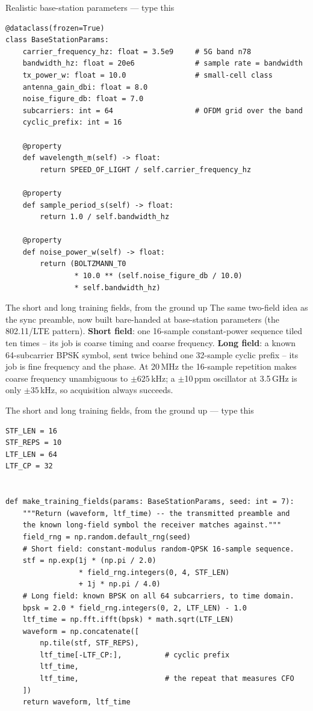 \documentclass[10pt]{beamer}
\begin{document}
\begin{frame}[fragile]{Realistic base-station parameters --- type this}
\begin{lstlisting}[basicstyle=\ttfamily\tiny]
@dataclass(frozen=True)
class BaseStationParams:
    carrier_frequency_hz: float = 3.5e9     # 5G band n78
    bandwidth_hz: float = 20e6              # sample rate = bandwidth
    tx_power_w: float = 10.0                # small-cell class
    antenna_gain_dbi: float = 8.0
    noise_figure_db: float = 7.0
    subcarriers: int = 64                   # OFDM grid over the band
    cyclic_prefix: int = 16

    @property
    def wavelength_m(self) -> float:
        return SPEED_OF_LIGHT / self.carrier_frequency_hz

    @property
    def sample_period_s(self) -> float:
        return 1.0 / self.bandwidth_hz

    @property
    def noise_power_w(self) -> float:
        return (BOLTZMANN_T0
                * 10.0 ** (self.noise_figure_db / 10.0)
                * self.bandwidth_hz)
\end{lstlisting}
\end{frame}

\begin{frame}{The short and long training fields, from the ground up}
  The same two-field idea as the sync preamble, now built
  bare-handed at base-station parameters (the 802.11/LTE
  pattern). \textbf{Short field}: one 16-sample
  constant-power sequence tiled ten times -- its job is
  coarse timing and coarse frequency. \textbf{Long field}:
  a known 64-subcarrier BPSK symbol, sent twice behind one
  32-sample cyclic prefix -- its job is fine frequency and
  the phase. At 20\,MHz the 16-sample repetition makes
  coarse frequency unambiguous to $\pm 625$\,kHz; a
  $\pm$10\,ppm oscillator at 3.5\,GHz is only
  $\pm 35$\,kHz, so acquisition always succeeds.
\end{frame}

\begin{frame}[fragile]{The short and long training fields, from the ground up --- type this}
\begin{lstlisting}[basicstyle=\ttfamily\tiny]
STF_LEN = 16
STF_REPS = 10
LTF_LEN = 64
LTF_CP = 32


def make_training_fields(params: BaseStationParams, seed: int = 7):
    """Return (waveform, ltf_time) -- the transmitted preamble and
    the known long-field symbol the receiver matches against."""
    field_rng = np.random.default_rng(seed)
    # Short field: constant-modulus random-QPSK 16-sample sequence.
    stf = np.exp(1j * (np.pi / 2.0)
                 * field_rng.integers(0, 4, STF_LEN)
                 + 1j * np.pi / 4.0)
    # Long field: known BPSK on all 64 subcarriers, to time domain.
    bpsk = 2.0 * field_rng.integers(0, 2, LTF_LEN) - 1.0
    ltf_time = np.fft.ifft(bpsk) * math.sqrt(LTF_LEN)
    waveform = np.concatenate([
        np.tile(stf, STF_REPS),
        ltf_time[-LTF_CP:],          # cyclic prefix
        ltf_time,
        ltf_time,                    # the repeat that measures CFO
    ])
    return waveform, ltf_time
\end{lstlisting}
\end{frame}
\end{document}
